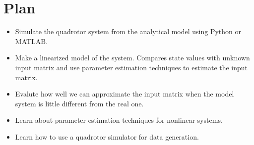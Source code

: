\documentclass[12pt]{article}
\begin{document}
\section*{Plan}
\begin{itemize}
    \item Simulate the quadrotor system from the analytical model using Python or MATLAB.
    \item Make a linearized model of the system. Compares state values with unknown input matrix and use parameter estimation techniques to estimate the input matrix. 
    \item Evalute how well we can approximate the input matrix when the model system is little different from the real one.
    \item Learn about parameter estimation techniques for nonlinear systems.
    \item Learn how to use a quadrotor simulator for data generation.
\end{itemize}

\pagebreak


\end{document}
